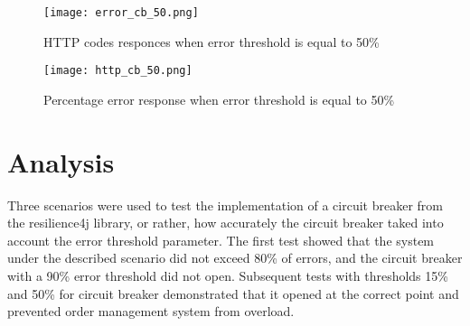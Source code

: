 \begin{figure}[t]
    \centering
    \texttt{[image: error\_cb\_50.png]}
    \caption{HTTP codes responces when error threshold is equal to 50\%}
    \label{fig:error-cb-50}
\end{figure}

\begin{figure}[t]
    \centering
    \texttt{[image: http\_cb\_50.png]}
    \caption{Percentage error response when error threshold is equal to 50\%}
    \label{fig:http-cb-50}
\end{figure}

\section{Analysis}\label{sec:analysis}
Three scenarios were used to test the implementation of a circuit breaker from the resilience4j library, or
rather, how accurately the circuit breaker taked into account the error threshold parameter. The first test showed that the system
under the described scenario did not exceed 80\% of errors, and the circuit breaker with a 90\% error threshold did not
open. Subsequent tests with thresholds 15\% and 50\% for circuit breaker demonstrated that it opened
at the correct point and prevented order management system from overload.


